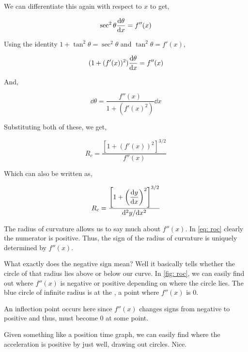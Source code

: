 We can differentiate this again with respect to \(x\) to get,

\begin{equation*}
    \sec^2\theta \dv{\theta}{x} = f''(x)
\end{equation*}


Using the identity \(1 + \tan^2\theta = \sec^2 \theta\) and \(\tan^2 \theta = f'(x)\),

\begin{equation*}
    (1 + (f'(x))^2) \dv{\theta}{x} = f''(x)
\end{equation*}

And, 

\begin{equation*}
    \dd{\theta} = \frac{f''(x)}{1 + (f'(x)^2)} \dd{x}
\end{equation*}

Substituting both of these, we get, 

\begin{equation}
    \label{eq: roc}
    \boxed{R_c = \frac{[1 + (f'(x))^2]^{3/2}}{f''(x)}}
\end{equation}


Which can also be written as,

\begin{equation*}
    R_c = \frac{\left[1 + \left(\displaystyle \dv{y}{x}\right)^2\right]^{3/2}}{\dv*[2]{y}{x}}
\end{equation*}

The radius of curvature allows us to say much about \(f''(x)\). In \eqref{eq: roc} 
clearly the numerator is positive. Thus, the sign of the radius of curvature is uniquely determined 
by \(f''(x)\). 

What exactly does the negative sign mean? Well it basically tells whether the circle of 
that radius lies above or below our curve. In \cref{fig: roc}, we 
can easily find out where \(f''(x)\) is negative or 
positive depending on where the circle lies. The blue circle of infinite radius 
is at the , a point where \(f''(x)\) is \(0\). 

An inflection point occurs here since \(f''(x)\) changes signs from negative to positive
and thus, must become \(0\) at some point.

Given something like a position time graph, 
we can easily find where the acceleration is positive by just well, drawing out circles.
Nice.

